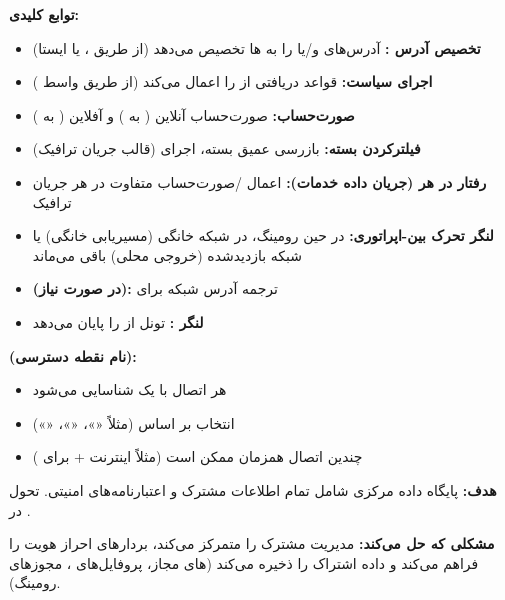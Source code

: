 \textbf{توابع کلیدی:}

\begin{itemize}
\tightlist
\item
  \textbf{تخصیص آدرس :} آدرس‌های  و/\allowbreak{}یا  را به ها تخصیص می‌دهد (از طریق ،  یا ایستا)
\item
  \textbf{اجرای سیاست:} قواعد  دریافتی از  را اعمال می‌کند (از طریق واسط )
\item
  \textbf{صورت‌حساب:} صورت‌حساب آنلاین ( به ) و آفلاین ( به )
\item
  \textbf{فیلترکردن بسته:} بازرسی عمیق بسته، اجرای  (قالب جریان ترافیک)
\item
  \textbf{رفتار در هر  (جریان داده خدمات):} اعمال /\allowbreak{}صورت‌حساب متفاوت در هر جریان ترافیک
\item
  \textbf{لنگر تحرک بین-اپراتوری:} در حین رومینگ،  در شبکه خانگی (مسیریابی خانگی) یا شبکه بازدیدشده (خروجی محلی) باقی می‌ماند
\item
  \textbf{ (در صورت نیاز):} ترجمه آدرس شبکه برای 
\item
  \textbf{لنگر :} تونل  از  را پایان می‌دهد
\end{itemize}

\textbf{ (نام نقطه دسترسی):}

\begin{itemize}
\tightlist
\item
  هر اتصال  با یک  شناسایی می‌شود
\item
  انتخاب  بر اساس  (مثلاً «»، «»، «»)
\item
  چندین اتصال  همزمان ممکن است (مثلاً اینترنت +  برای )
\end{itemize}


\textbf{هدف:} پایگاه داده مرکزی شامل تمام اطلاعات مشترک و اعتبارنامه‌های امنیتی. تحول  در .

\textbf{مشکلی که حل می‌کند:} مدیریت مشترک را متمرکز می‌کند، بردارهای احراز هویت را فراهم می‌کند و داده اشتراک را ذخیره می‌کند (های مجاز، پروفایل‌های ، مجوزهای رومینگ).

